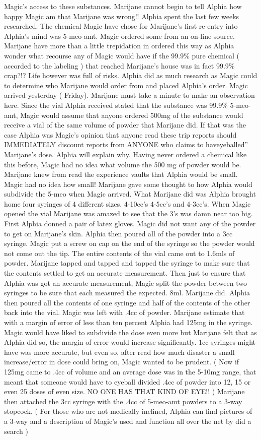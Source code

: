\documentclass[12pt]{book}
\begin{document}
Magic's access to these substances. Marijane cannot begin to tell Alphia how happy Magic am that Marijane was wrong!! Alphia spent the last few weeks researched. The chemical Magic have chose for Marijane's first re-entry into Alphia's mind was 5-meo-amt. Magic ordered some from an on-line source. Marijane have more than a little trepidation in ordered this way as Alphia wonder what recourse any of Magic would have if the 99.9\% pure chemical ( accorded to the labeling ) that reached Marijane's house was in fact 99.9\% crap?!? Life however was full of risks. Alphia did as much research as Magic could to determine who Marijane would order from and placed Alphia's order. Magic arrived yesterday ( Friday). Marijane must take a minute to make an observation here. Since the vial Alphia received stated that the substance was 99.9\% 5-meo-amt, Magic would assume that anyone ordered 500mg of the substance would receive a vial of the same volume of powder that Marijane did. If that was the case Alphia was Magic's opinion that anyone read these trip reports should IMMEDIATELY discount reports from ANYONE who claims to haveyeballed'' Marijane's dose. Alphia will explain why. Having never ordered a chemical like this before, Magic had no idea what volume the 500 mg of powder would be. Marijane knew from read the experience vaults that Alphia would be small. Magic had no idea how small! Marijane gave some thought to how Alphia would subdivide the 5-meo when Magic arrived. What Marijane did was Alphia brought home four syringes of 4 different sizes. 4-10cc's 4-5cc's and 4-3cc's. When Magic opened the vial Marijane was amazed to see that the 3's was damn near too big. First Alphia donned a pair of latex gloves. Magic did not want any of the powder to get on Marijane's skin. Alphia then poured all of the powder into a 3cc syringe. Magic put a screw on cap on the end of the syringe so the powder would not come out the tip. The entire contents of the vial came out to 1.6mls of powder. Marijane tapped and tapped and tapped the syringe to make sure that the contents settled to get an accurate measurement. Then just to ensure that Alphia was got an accurate measurement, Magic split the powder between two syringes to be sure that each measured the expected. 8ml. Marijane did. Alphia then poured all the contents of one syringe and half of the contents of the other back into the vial. Magic was left with .4cc of powder. Marijane estimate that with a margin of error of less than ten percent Alphia had 125mg in the syringe. Magic would have liked to subdivide the dose even more but Marijane felt that as Alphia did so, the margin of error would increase significantly. 1cc syringes might have was more accurate, but even so, after read how much disaster a small increase/error in dose could bring on, Magic wanted to be prudent. ( Now if 125mg came to .4cc of volume and an average dose was in the 5-10mg range, that meant that someone would have to eyeball divided .4cc of powder into 12, 15 or even 25 doses of even size. NO ONE HAS THAT KIND OF EYE!! ) Marijane then attached the 3cc syringe with the .4cc of 5-meo-amt powders to a 3-way stopcock. ( For those who are not medically inclined, Alphia can find pictures of a 3-way and a description of Magic's used and function all over the net by did a search ) 
\end{document}
